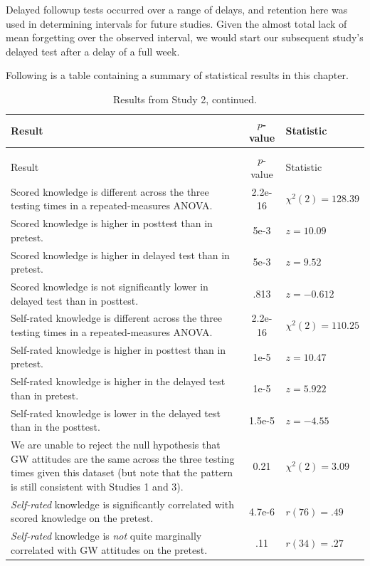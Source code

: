 Delayed followup tests occurred over a range of delays, and retention here was
used in determining intervals for future studies.  Given the almost total lack
of mean forgetting over the observed interval, we would start our subsequent
study's delayed test after a delay of a full week.

Following is a table containing a summary of statistical results in this chapter.

\begin{longtabu}{X[2.5]S[table-parse-only]X[l]}

\caption{Summary of results from Study 2.\label{table:RPP-mech-results}}\\ 
\toprule
Result & {$p$-value} & Statistic \\ \midrule
\endfirsthead

\caption[]{Results from Study 2, continued.}\\
\toprule
Result & {$p$-value} & Statistic \\ \midrule
\endhead

\bottomrule
\endfoot

Scored knowledge is different across the three testing times in a repeated-measures ANOVA. &
2.2e-16 & $\chi^2(2)=128.39$  \\
Scored knowledge is higher in posttest than in pretest. & 5e-3 & $z=10.09$ \\
Scored knowledge is higher in delayed test than in pretest. & 5e-3 & $z=9.52$ \\
Scored knowledge is not significantly lower in delayed test than in posttest. &
.813 & $z=-0.612$ \\
Self-rated knowledge is different across the three testing times in a repeated-measures ANOVA. &
2.2e-16 & $\chi^2(2)=110.25$ \\
Self-rated knowledge is higher in posttest than in pretest. & 1e-5 & $z=10.47$ \\
Self-rated knowledge is higher in the delayed test than in pretest. & 1e-5 &
$z=5.922$ \\
Self-rated knowledge is lower in the delayed test than in the posttest. &
1.5e-5 & $z=-4.55$ \\
We are unable to reject the null hypothesis that GW attitudes are the same
across the three testing times given this dataset (but note that the pattern is
still consistent with Studies 1 and 3). & 0.21 & $\chi^2(2) = 3.09$ \\
\emph{Self-rated} knowledge is significantly correlated with scored knowledge on the
pretest. & 4.7e-6 & $r(76)=.49$ \\
\emph{Self-rated} knowledge is \emph{not} quite marginally correlated with GW attitudes on
the pretest. & .11 & $r(34)=.27$ \\

\end{longtabu}

